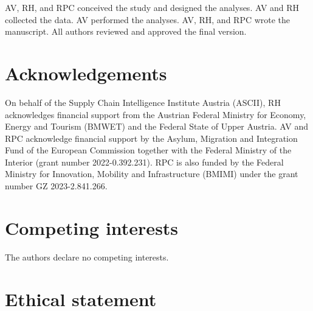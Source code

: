 \documentclass[fleqn,10pt,twocolumn]{wlscirep}
\begin{document}
AV, RH, and RPC conceived the study and designed the analyses. AV and RH collected the data. AV performed the analyses. AV, RH, and RPC wrote the manuscript. All authors reviewed and approved the final version.

\section*{Acknowledgements}

On behalf of the Supply Chain Intelligence Institute Austria (ASCII), RH acknowledges financial support from the Austrian Federal Ministry for Economy, Energy and Tourism (BMWET) and the Federal State of Upper Austria. AV and RPC acknowledge financial support by the Asylum, Migration and Integration Fund of the European Commission together with the Federal Ministry of the Interior (grant number 2022-0.392.231). RPC is also funded by the Federal Ministry for Innovation, Mobility and Infrastructure (BMIMI) under the grant number GZ 2023-2.841.266.

\section*{Competing interests}

The authors declare no competing interests.

\section*{Ethical statement}
\end{document}

